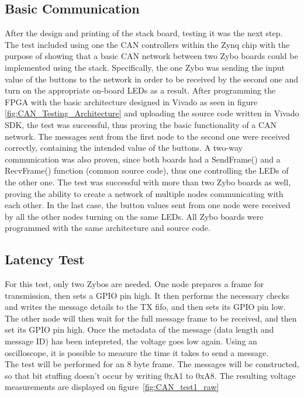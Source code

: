 \subsection{Basic Communication}
\label{sub:TestingCANStack_BareMetal}
After the design and printing of the stack board, testing it was the next step.
The test included using one the CAN controllers within the Zynq chip with the purpose of showing that a basic CAN network between two Zybo boards could be implemented using the stack.
Specifically, the one Zybo was sending the input value of the buttons to the network in order to be received by the second one and turn on the appropriate on-board LEDs as a result.
After programming the FPGA with the basic architecture designed in Vivado as seen in figure \ref{fig:CAN_Testing_Architecture} and uploading the source code written in Vivado SDK, the test was successful, thus proving the basic functionality of a CAN network.
The messages sent from the first node to the second one were received correctly, containing the intended value of the buttons.
A two-way communication was also proven, since both boards had a SendFrame() and a RecvFrame() function (common source code), thus one controlling the LEDs of the other one.
The test was successful with more than two Zybo boards as well, proving the ability to create a network of multiple nodes communicating with each other.
In the last case, the button values sent from one node were received by all the other nodes turning on the same LEDs.
All Zybo boards were programmed with the same architecture and source code.

\subsection{Latency Test}\label{sub:CAN_latency}
For this test, only two Zybos are needed.
One node prepares a frame for transmission, then sets a GPIO pin high.
It then performs the necessary checks and writes the message details to the TX fifo, and then sets its GPIO pin low. \\
The other node will then wait for the full message frame to be received, and then set its GPIO pin high.
Once the metadata of the message (data length and message ID) has been intepreted, the voltage goes low again.
Using an oscilloscope, it is possible to measure the time it takes to send a message.\\

The test will be performed for an 8 byte frame.
The messages will be constructed, so that bit stuffing doesn't occur by writing 0xA1 to 0xA8. 
The resulting voltage measurements are displayed on figure~\ref{fig:CAN_test1_raw}

